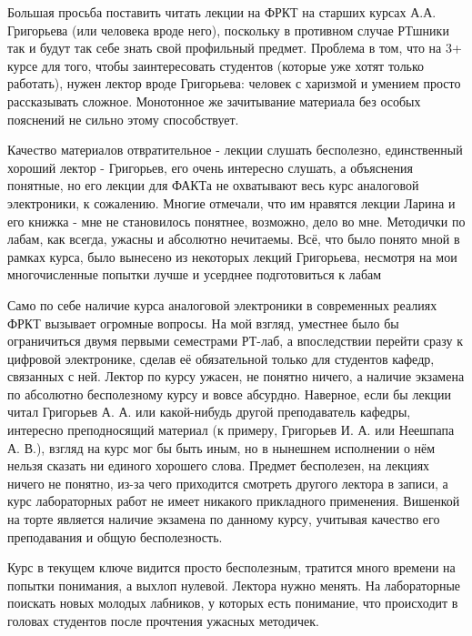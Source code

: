         \begin{commentbox}
			Большая просьба поставить читать лекции на ФРКТ на старших курсах А.А. Григорьева (или человека вроде него), поскольку в противном случае РТшники так и будут так себе знать свой профильный предмет. Проблема в том, что на 3+ курсе для того, чтобы заинтересовать студентов (которые уже хотят только работать), нужен лектор вроде Григорьева: человек с харизмой и умением просто рассказывать сложное. Монотонное же зачитывание материала без особых пояснений не сильно этому способствует.
		\end{commentbox}

        \begin{commentbox}
			Качество материалов отвратительное - лекции слушать бесполезно, единственный хороший лектор - Григорьев, его очень интересно слушать, а объяснения понятные, но его лекции для ФАКТа не охватывают весь курс аналоговой электроники, к сожалению. Многие отмечали, что им нравятся лекции Ларина и его книжка - мне не становилось понятнее, возможно, дело во мне. Методички по лабам, как всегда, ужасны и абсолютно нечитаемы. Всё, что было понято мной в рамках курса, было вынесено из некоторых лекций Григорьева, несмотря на мои многочисленные попытки лучше и усерднее подготовиться к лабам
		\end{commentbox}

        \begin{commentbox}
			Само по себе наличие курса аналоговой электроники в современных реалиях ФРКТ вызывает огромные вопросы. На мой взгляд, уместнее было бы ограничиться двумя первыми семестрами РТ-лаб, а впоследствии перейти сразу к цифровой электронике, сделав её обязательной только для студентов кафедр, связанных с ней. Лектор по курсу ужасен, не понятно ничего, а наличие экзамена по абсолютно бесполезному курсу и вовсе абсурдно. Наверное, если бы лекции читал Григорьев А. А. или какой-нибудь другой преподаватель кафедры, интересно преподносящий материал (к примеру, Григорьев И. А. или Неешпапа А. В.), взгляд на курс мог бы быть иным, но в нынешнем исполнении о нём нельзя сказать ни единого хорошего слова. Предмет бесполезен, на лекциях ничего не понятно, из-за чего приходится смотреть другого лектора в записи, а курс лабораторных работ не имеет никакого прикладного применения. Вишенкой на торте является наличие экзамена по данному курсу, учитывая качество его преподавания и общую бесполезность.
		\end{commentbox}

        \begin{commentbox}
			Курс в текущем ключе видится просто бесполезным, тратится много времени на попытки понимания, а выхлоп нулевой. Лектора нужно менять. На лабораторные поискать новых молодых лабников, у которых есть понимание, что происходит в головах студентов после прочтения ужасных методичек.
		\end{commentbox}

